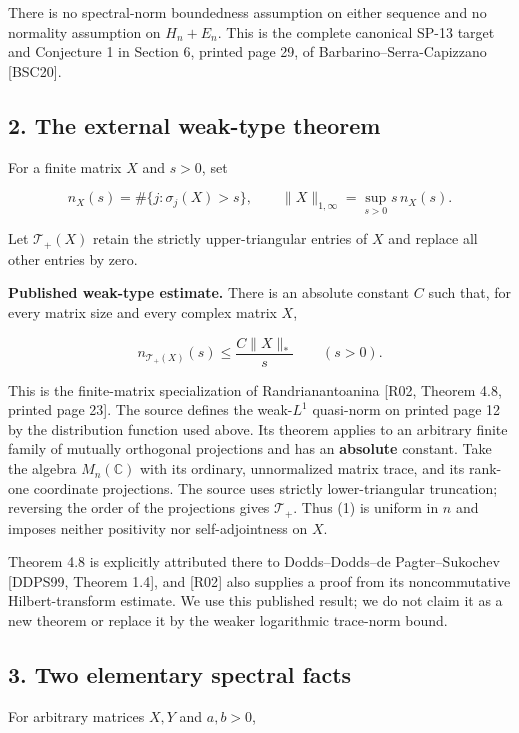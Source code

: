 \documentclass[10pt,a4paper]{article}
\begin{document}
There is no spectral-norm boundedness assumption on either sequence and
no normality assumption on \(H_n+E_n\). This is the complete canonical
SP-13 target and Conjecture 1 in Section 6, printed page 29, of
Barbarino--Serra-Capizzano {[}BSC20{]}.

\subsection{2. The external weak-type
theorem}\label{the-external-weak-type-theorem}

For a finite matrix \(X\) and \(s>0\), set

\[n_X(s)=\#\{j:\sigma_j(X)>s\},\qquad
\|X\|_{1,\infty}=\sup_{s>0}s\,n_X(s).\]

Let \(\mathcal T_+(X)\) retain the strictly upper-triangular entries of
\(X\) and replace all other entries by zero.

\textbf{Published weak-type estimate.} There is an absolute constant
\(C\) such that, for every matrix size and every complex matrix \(X\),

\[n_{\mathcal T_+(X)}(s)\le \frac{C\|X\|_*}{s}\qquad(s>0).\tag{1}\]

This is the finite-matrix specialization of Randrianantoanina {[}R02,
Theorem 4.8, printed page 23{]}. The source defines the weak-\(L^1\)
quasi-norm on printed page 12 by the distribution function used above.
Its theorem applies to an arbitrary finite family of mutually orthogonal
projections and has an \textbf{absolute} constant. Take the algebra
\(M_n(\mathbb C)\) with its ordinary, unnormalized matrix trace, and its
rank-one coordinate projections. The source uses strictly
lower-triangular truncation; reversing the order of the projections
gives \(\mathcal T_+\). Thus (1) is uniform in \(n\) and imposes neither
positivity nor self-adjointness on \(X\).

Theorem 4.8 is explicitly attributed there to Dodds--Dodds--de
Pagter--Sukochev {[}DDPS99, Theorem 1.4{]}, and {[}R02{]} also supplies
a proof from its noncommutative Hilbert-transform estimate. We use this
published result; we do not claim it as a new theorem or replace it by
the weaker logarithmic trace-norm bound.

\subsection{3. Two elementary spectral
facts}\label{two-elementary-spectral-facts}

For arbitrary matrices \(X,Y\) and \(a,b>0\),
\end{document}
